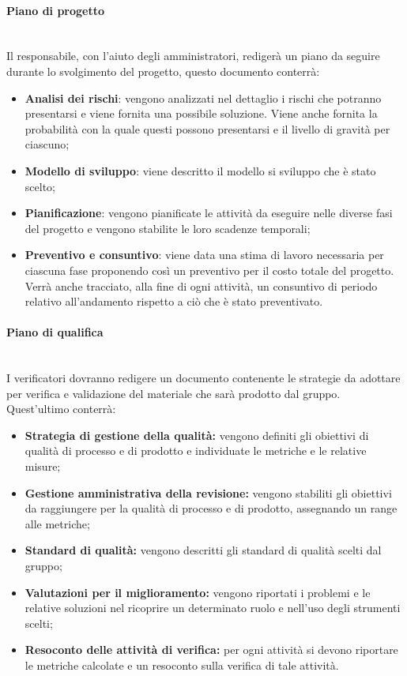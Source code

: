 \begin{itemize}
\paragraph{Piano di progetto} \mbox{}\\
Il responsabile, con l'aiuto degli amministratori, redigerà un piano da seguire durante lo svolgimento del progetto, questo documento conterrà:
\begin{itemize}
	\item \textbf{Analisi dei rischi}: vengono analizzati nel dettaglio i rischi che potranno presentarsi e viene fornita una possibile soluzione. Viene anche fornita la probabilità con la quale questi possono presentarsi e il livello di gravità per ciascuno;
	\item \textbf{Modello di sviluppo}: viene descritto il modello si sviluppo che è stato scelto;
	\item \textbf{Pianificazione}: vengono pianificate le attività da eseguire nelle diverse fasi del progetto e vengono stabilite le loro scadenze temporali;
	\item \textbf{Preventivo e consuntivo}: viene data una stima di lavoro necessaria per ciascuna fase proponendo così un preventivo per il costo totale del progetto. Verrà anche tracciato, alla fine di ogni attività, un consuntivo di periodo relativo all'andamento rispetto a ciò che è stato preventivato.
\end{itemize}
\paragraph{Piano di qualifica} \mbox{}\\
I verificatori dovranno redigere un documento contenente le strategie da adottare per verifica e validazione del materiale che sarà prodotto dal gruppo. Quest'ultimo conterrà:
\begin{itemize}
	\item \textbf{Strategia di gestione della qualità:} vengono definiti gli obiettivi di qualità di processo e di prodotto e individuate le metriche e le relative misure;
	\item \textbf{Gestione amministrativa della revisione:} vengono stabiliti gli obiettivi da raggiungere per la qualità di processo e di prodotto, assegnando un range alle metriche;
	\item \textbf{Standard di qualità:} vengono descritti gli standard di qualità scelti dal gruppo;
	\item \textbf{Valutazioni per il miglioramento:} vengono riportati i problemi e le relative soluzioni nel ricoprire un determinato ruolo e nell'uso degli strumenti scelti;
	\item \textbf{Resoconto delle attività di verifica:} per ogni attività si devono riportare le metriche calcolate e un resoconto sulla verifica di tale attività.
\end{itemize}


\end{itemize}
